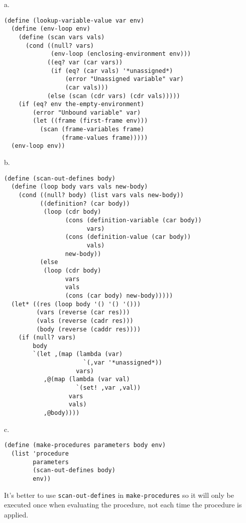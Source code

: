 \documentclass[a4paper,12pt]{article}
\newcommand{\subpar}[1]{\medskip \noindent #1.}
\begin{document}
\subpar{a}
\begin{lstlisting}
(define (lookup-variable-value var env)
  (define (env-loop env)
    (define (scan vars vals)
      (cond ((null? vars)
             (env-loop (enclosing-environment env)))
            ((eq? var (car vars))
             (if (eq? (car vals) '*unassigned*)
                 (error "Unassigned variable" var)
                 (car vals)))
            (else (scan (cdr vars) (cdr vals)))))
    (if (eq? env the-empty-environment)
        (error "Unbound variable" var)
        (let ((frame (first-frame env)))
          (scan (frame-variables frame)
                (frame-values frame)))))
  (env-loop env))
\end{lstlisting}

\subpar{b}
\begin{lstlisting}
(define (scan-out-defines body)
  (define (loop body vars vals new-body)
    (cond ((null? body) (list vars vals new-body))
          ((definition? (car body))
           (loop (cdr body)
                 (cons (definition-variable (car body))
                       vars)
                 (cons (definition-value (car body))
                       vals)
                 new-body))
          (else
           (loop (cdr body)
                 vars
                 vals
                 (cons (car body) new-body)))))
  (let* ((res (loop body '() '() '()))
         (vars (reverse (car res)))
         (vals (reverse (cadr res)))
         (body (reverse (caddr res))))
    (if (null? vars)
        body
        `(let ,(map (lambda (var)
                      `(,var '*unassigned*))
                    vars)
           ,@(map (lambda (var val)
                    `(set! ,var ,val))
                  vars
                  vals)
           ,@body))))
\end{lstlisting}

\subpar{c}

\begin{lstlisting}
(define (make-procedures parameters body env)
  (list 'procedure
        parameters
        (scan-out-defines body)
        env))
\end{lstlisting}

It's better to use \lstinline!scan-out-defines! in
\lstinline!make-procedures! so it will only be executed once when
evaluating the procedure, not each time the procedure is applied.
\end{document}
